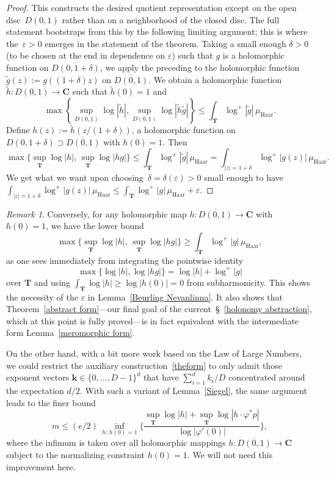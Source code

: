 \documentclass[10pt]{amsart}
\def\SSS{\S}
\def\SSSS{\S}
\def\T{\mathbf{T}}
\def\bk{\mathbf{k}}
\theoremstyle{remark}
\newtheorem{remark}[subsubsection]{Remark}
\numberwithin{equation}{subsection}
\def\C{\mathbf{C}}
\begin{document}
\begin{proof}
This constructs the desired quotient representation except on the open disc~$D(0,1)$ rather than on a neighborhood of the closed disc. 
The full statement bootstraps from this by the following limiting argument; this is where the~$\varepsilon > 0$ emerges in the statement of the theorem. 
Taking a small enough $\delta>0$ (to be chosen at the end in dependence on $\varepsilon$) such that $g$ is a holomorphic function on $\overline{D(0, 1+\delta)}$,  
we apply the preceding to the holomorphic function $\widetilde{g}(z):=g((1+\delta)z)$ on $\overline{D(0,1)}$. We obtain a holomorphic function $\widetilde{h} : D(0,1) \to \C$ such that $\widetilde{h}(0)=1$ and
\[\max \left\{\sup_{ D(0,1)} \log |\widetilde{h}|, \sup_{D(0,1)} \log |\widetilde{h}\widetilde{g}| \right\} \leq \int_{\T} \log^+{|\widetilde{g}|} \, \mu_{\mathrm{Haar}}.\]
Define $h(z):=\widetilde{h}(z/(1+\delta))$,  a holomorphic function on $D(0,1+\delta) \supset \overline{D(0,1)}$ with $h(0)=1$. Then
\[\max \big\{ \sup_{\T} \log{|h|}, \, \sup_{\T} \log{|hg|} \big\} \leq \int_{\T} \log^+{|\widetilde{g}|} \, \mu_{\mathrm{Haar}} = \int_{|z|=1+\delta } \log^+{|g(z)|} \, \mu_{\mathrm{Haar}}.\]
We get what we want upon choosing~$\delta = \delta(\varepsilon) > 0$ small enough to have $\displaystyle \int_{|z|=1+\delta } \log^+{|g(z)|} \, \mu_{\mathrm{Haar}} \leq \int_{\T} \log^+{|g|} \, \mu_{\mathrm{Haar}} + \varepsilon$. 
\end{proof}

\begin{remark} \label{large numbers} 
Conversely, for any holomorphic map $h : \overline{D(0,1)} \to \C$ with $h(0) = 1$, we have the lower bound
$$
\max \big\{ \sup_{\T} \log{|h|}, \, \sup_{\T} \log{|hg|} \big\}  \geq  \int_{\T} \log^+{|g|} \, \mu_{\mathrm{Haar}},
$$
as one sees immediately from integrating the pointwise identity
$$
\max\{ \log{|h|}, \log{|hg|} \}  =  \log{|h|} + \log^+{|g|}
$$
over $\T$ and using $\int_{\T} \log{|h|} \geq \log{|h(0)|} = 0$ from subharmonicity. This shows the necessity of the $\varepsilon$ in
Lemma~\ref{Beurling Nevanlinna}. It also shows that Theorem~\ref{abstract form}---our final goal of the current~\SSSS~\ref{holonomy abstraction},
which at this point is fully proved---is in fact equivalent with the intermediate form Lemma~\ref{meromorphic form}.  

On the other hand, with a bit more work based on the Law of Large Numbers, we could restrict the auxiliary construction~\eqref{theform} to only admit those exponent vectors $\bk \in \{0, \ldots, D-1\}^{d}$ that have $\sum_{i=1}^{d} k_i/D$ concentrated around the expectation $d/2$. With such a variant of Lemma~\ref{Siegel}, the same argument leads to 
the finer bound
\begin{equation*} 
m \leq (e/2) \,  \inf_{h: \, h(0) = 1} \Big\{ \frac{   \sup_{\T}{\log{|h|}} +  \sup_{\T}{\log{|h \cdot \varphi^* p|}}   }{\log{|\varphi'(0)|}} \Big\},
\end{equation*}
where the infimum is taken over all holomorphic mappings $h : \overline{D(0,1)} \to \C$ subject to the
normalizing constraint $h(0) = 1$.
We will not need this improvement here. 
\end{remark}
\end{document}
